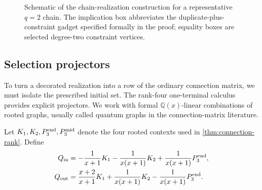 \documentclass[11pt,reqno]{amsart}
\theoremstyle{definition}
\begin{document}
\begin{figure}[ht]
\centering
{}
\caption{Schematic of the chain-realization construction for a representative
$q=2$ chain.  The implication box abbreviates the duplicate-plus-constraint
gadget specified formally in the proof; equality boxes are selected
degree-two constraint vertices.}
\label{fig:chain-realization}
\end{figure}

\subsection{Selection projectors}

To turn a decorated realization into a row of the ordinary connection matrix,
we must isolate the prescribed initial set.  The rank-four one-terminal
calculus provides explicit projectors.  We work with formal
$\mathbb Q(x)$-linear combinations of rooted graphs, usually called quantum
graphs in the connection-matrix literature.

Let $K_1,K_2,P_3^{\rm end},P_3^{\rm mid}$ denote the four rooted contexts used
in \cref{thm:connection-rank}.  Define
\begin{align}
 Q_{\rm in}
 &= -\frac1{x+1}K_1
    -\frac1{x(x+1)}K_2
    +\frac1{x(x+1)}P_3^{\rm end},
 \label{eq:projector-in}\\
 Q_{\rm out}
 &= \frac{x+2}{x+1}K_1
    +\frac1{x(x+1)}K_2
    -\frac1{x(x+1)}P_3^{\rm end}.
 \label{eq:projector-out}
\end{align}
\end{document}
